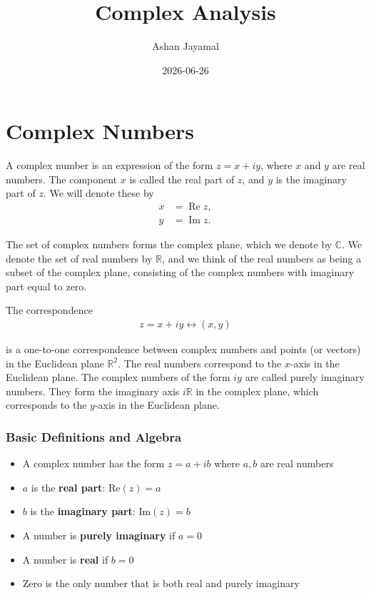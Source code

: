 \documentclass[
]{book}
\title{Complex Analysis}
\author{Ashan Jayamal}
\date{2026-06-26}
\providecommand{\tightlist}{%
  \setlength{\itemsep}{0pt}\setlength{\parskip}{0pt}}
\theoremstyle{definition}
\theoremstyle{definition}
\theoremstyle{definition}
\theoremstyle{definition}
\theoremstyle{remark}
\begin{document}
\maketitle

{
\setcounter{tocdepth}{1}
\tableofcontents
}
\chapter{Complex Numbers}\label{complex-numbers}

A complex number is an expression of the form \(z = x+iy\), where \(x\) and \(y\) are real numbers. The component \(x\) is called the real part of \(z\), and \(y\) is the imaginary part of \(z\). We will denote these by
\begin{align*}
x &= \operatorname{Re}z, \\
y &= \operatorname{Im}z.
\end{align*}

The set of complex numbers forms the complex plane, which we denote by \(\mathbb{C}\). We denote the set of real numbers by \(\mathbb{R}\), and we think of the real numbers as being a subset of the complex plane, consisting of the complex numbers with imaginary part equal to zero.

The correspondence
\begin{align*}
z = x+iy \longleftrightarrow (x,y)
\end{align*}

is a one-to-one correspondence between complex numbers and points (or vectors) in the Euclidean plane \(\mathbb{R}^2\). The real numbers correspond to the \(x\)-axis in the Euclidean plane. The complex numbers of the form \(iy\) are called purely imaginary numbers. They form the imaginary axis \(i\mathbb{R}\) in the complex plane, which corresponds to the \(y\)-axis in the Euclidean plane.

\subsection{Basic Definitions and Algebra}\label{basic-definitions-and-algebra}

\begin{itemize}
\tightlist
\item
  A complex number has the form \(z = a + ib\) where \(a, b\) are real numbers
\item
  \(a\) is the \textbf{real part}: \(\text{Re}(z) = a\)
\item
  \(b\) is the \textbf{imaginary part}: \(\text{Im}(z) = b\)
\item
  A number is \textbf{purely imaginary} if \(a = 0\)
\item
  A number is \textbf{real} if \(b = 0\)
\item
  Zero is the only number that is both real and purely imaginary
\end{itemize}
\end{document}
